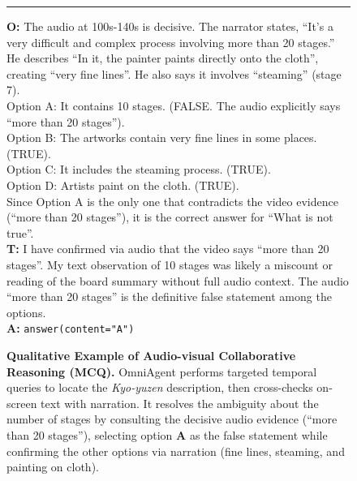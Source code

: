 \documentclass{article}
\theoremstyle{plain}
\theoremstyle{definition}
\theoremstyle{remark}
\begin{document}
\begin{figure}[!ht]
\begin{minipage}{0.95\textwidth}
    \vspace{0.2em}\hrule\vspace{0.2em}
    
    \textbf{O:} The audio at 100s-140s is decisive. The narrator states, ``It's a very difficult and complex process involving more than 20 stages.'' He describes ``In it, the painter paints directly onto the cloth'', creating ``very fine lines''. He also says it involves ``steaming'' (stage 7). \\
    Option A: It contains 10 stages. (FALSE. The audio explicitly says ``more than 20 stages'').\\
    Option B: The artworks contain very fine lines in some places. (TRUE).\\
    Option C: It includes the steaming process. (TRUE).\\
    Option D: Artists paint on the cloth. (TRUE).\\
    Since Option A is the only one that contradicts the video evidence (``more than 20 stages''), it is the correct answer for ``What is not true''.\\
    \textbf{T:} I have confirmed via audio that the video says ``more than 20 stages''. My text observation of 10 stages was likely a miscount or reading of the board summary without full audio context. The audio ``more than 20 stages'' is the definitive false statement among the options.\\
    \textbf{A:} \texttt{answer(content="A")}

    \end{minipage}

    \caption{\textbf{Qualitative Example of Audio-visual Collaborative Reasoning (MCQ).} OmniAgent performs targeted temporal queries to locate the \textit{Kyo-yuzen} description, then cross-checks on-screen text with narration. It resolves the ambiguity about the number of stages by consulting the decisive audio evidence (``more than 20 stages''), selecting option \textbf{A} as the false statement while confirming the other options via narration (fine lines, steaming, and painting on cloth).}
    \label{fig:qual_mcq_1}
\end{figure}
\end{document}

